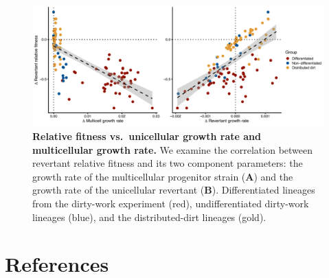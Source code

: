 \documentclass[
]{book}
\begin{document}
\begin{figure}
\centering
\includegraphics{images/Figure_S9_Relative_fitness_vs_uni_growth_rate_and_multi_growth_rate_12OCT22.png}
\caption{\label{fig:Relative-fitness-vs-uni-and-multi-growth-rates}\textbf{Relative fitness vs.~unicellular growth rate and multicellular growth rate.} We examine the correlation between revertant relative fitness and its two component parameters: the growth rate of the multicellular progenitor strain (\textbf{A}) and the growth rate of the unicellular revertant (\textbf{B}). Differentiated lineages from the dirty-work experiment (red), undifferentiated dirty-work lineages (blue), and the distributed-dirt lineages (gold).}
\end{figure}

\hypertarget{references}{%
\chapter{References}\label{references}}

  
\end{document}
